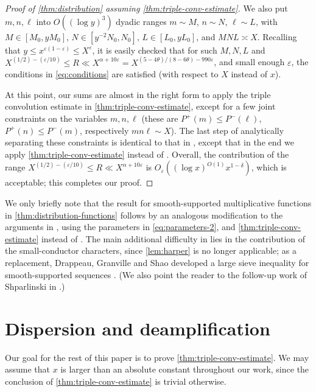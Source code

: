 \documentclass[reqno,11pt]{amsart}
\theoremstyle{definition}
\theoremstyle{remark}
\numberwithin{equation}{section}
\newcommand{\eps}{\varepsilon}
\begin{document}
\begin{proof}[Proof of \cref{thm:distribution} assuming \cref{thm:triple-conv-estimate}]
We also put $m, n, \ell$ into $O((\log y)^3)$ dyadic ranges $m \sim M$, $n \sim N$, $\ell \sim L$, with $M \in [M_0, yM_0]$, $N \in [y^{-2}N_0, N_0]$, $L \in [L_0, yL_0]$, and $MNL \asymp X$. Recalling that $y \le x^{\eps(1-\eps)} \le X^\eps$, it is easily checked that for such $M, N, L$ and $X^{(1/2)-(\eps/10)} \le R \ll X^{{\alpha}+10\eps} = X^{(5-4\theta)/(8-6\theta) - 990\eps}$, and small enough $\eps$, the conditions in \cref{eq:conditions} are satisfied (with respect to $X$ instead of $x$). 

At this point, our sums are almost in the right form to apply the triple convolution estimate in \cref{thm:triple-conv-estimate}, except for a few joint constraints on the variables $m, n, \ell$ (these are $P^+(m) \le P^-(\ell)$, $P^+(n) \le P^-(m)$, respectively $mn\ell \sim X$). The last step of analytically separating these constraints is identical to that in \cite[pp.\ 853--854]{drappeau2015theoremes}, except that in the end we apply \cref{thm:triple-conv-estimate} instead of \cite[Th\'eor\`eme 3]{drappeau2015theoremes}. Overall, the contribution of the range $X^{(1/2)-(\eps/10)} \le R \ll X^{{\alpha} + 10\eps}$ is $O_\eps\left( (\log x)^{O(1)} x^{1-\delta} \right)$, which is acceptable; this completes our proof.
\end{proof}

We only briefly note that the result for smooth-supported multiplicative functions in \cref{thm:distribution-functions} follows by an analogous modification to the arguments in \cite{drappeau2017smooth}, using the parameters in \cref{eq:parameters-2}, and \cref{thm:triple-conv-estimate} instead of \cite[Lemma 2.3]{drappeau2017smooth}. The main additional difficulty in \cite{drappeau2017smooth} lies in the contribution of the small-conductor characters, since \cref{lem:harper} is no longer applicable; as a replacement, Drappeau, Granville and Shao developed a large sieve inequality for smooth-supported sequences \cite[Theorem 5.1]{drappeau2017smooth}. (We also point the reader to the follow-up work of Shparlinski in \cite{shparlinski2018character}.)




\section{Dispersion and deamplification} \label{sec:setup}
Our goal for the rest of this paper is to prove \cref{thm:triple-conv-estimate}. We may assume that $x$ is larger than an absolute constant throughout our work, since the conclusion of \cref{thm:triple-conv-estimate} is trivial otherwise.
\end{document}
